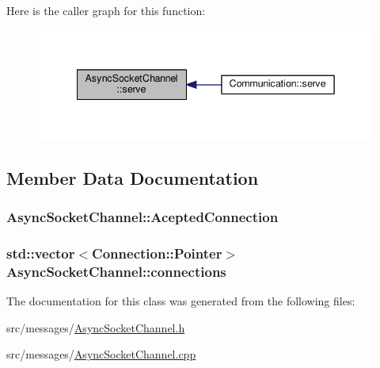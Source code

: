 Here is the caller graph for this function\+:
\nopagebreak
\begin{figure}[H]
\begin{center}
\leavevmode
\includegraphics[width=342pt]{class_async_socket_channel_ae0d0010ef42fecc249ae1542b226130c_icgraph}
\end{center}
\end{figure}




\subsection{Member Data Documentation}
\subsubsection[{\texorpdfstring{Acepted\+Connection}{AceptedConnection}}]{ Async\+Socket\+Channel\+::\+Acepted\+Connection}\hypertarget{class_async_socket_channel_a3dd24a37941604546e8875892410250c}{}\label{class_async_socket_channel_a3dd24a37941604546e8875892410250c}
\subsubsection[{\texorpdfstring{connections}{connections}}]{\setlength{\rightskip}{0pt plus 5cm}std\+::vector$<${\bf Connection\+::\+Pointer}$>$ Async\+Socket\+Channel\+::connections}\hypertarget{class_async_socket_channel_aae682104eaebf291b57c586489bb500f}{}\label{class_async_socket_channel_aae682104eaebf291b57c586489bb500f}


The documentation for this class was generated from the following files\+:\begin{DoxyCompactItemize}
\item 
src/messages/\hyperlink{_async_socket_channel_8h}{Async\+Socket\+Channel.\+h}\item 
src/messages/\hyperlink{_async_socket_channel_8cpp}{Async\+Socket\+Channel.\+cpp}\end{DoxyCompactItemize}
